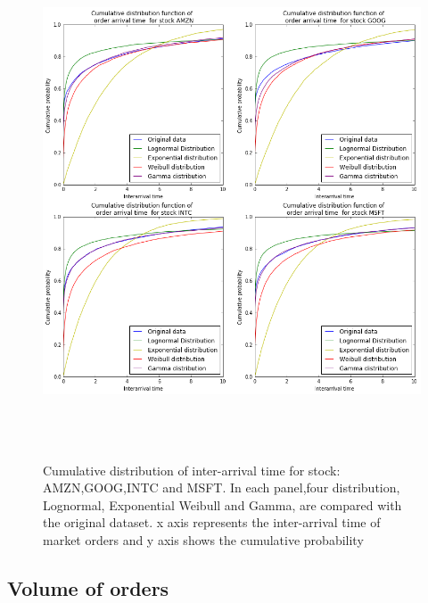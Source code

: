\begin{figure}[hbtp]
  \begin{center}
    \includegraphics[width=6in,height=6in]{figures/arrival_time.png}
  \end{center}
\caption{Cumulative distribution of inter-arrival time for stock: AMZN,GOOG,INTC and MSFT. In each panel,four distribution, Lognormal, Exponential Weibull and Gamma, are compared with the original dataset. x axis represents the inter-arrival time of market orders and y axis shows the cumulative probability } \label{fig:arrival}
\end{figure}


\subsection{Volume of orders}

 

